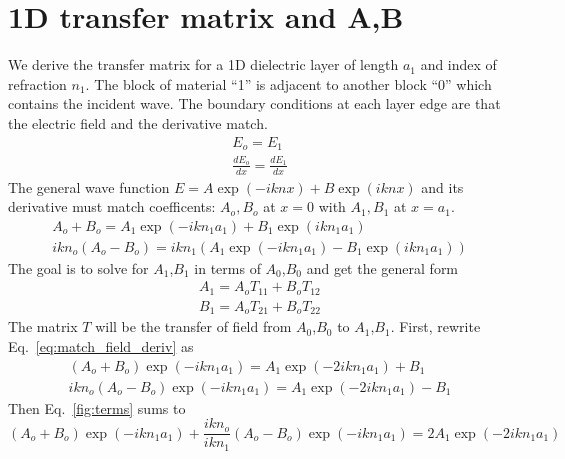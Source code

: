\section{1D transfer matrix and A,B}
We derive the transfer matrix for a 1D dielectric layer of length $a_1$ and index of refraction $n_1$. The block of material ``1'' is adjacent to another block ``0'' which contains the incident wave. The boundary conditions at each layer edge are that the electric field and the derivative match.
\begin{equation}
\begin{gathered}
E_o = E_1\\
\frac{dE_o}{dx} = \frac{dE_1}{dx}
\end{gathered}
\end{equation}
The general wave function $E=A \exp(-i k n x) + B \exp(i k n x)$ and its derivative must match coefficents: $A_o, B_o$ at $x=0$ with $A_1, B_1$ at $x=a_1$.
\begin{equation}
\begin{gathered}
A_o + B_o = A_1 \exp(-i k n_1 a_1) + B_1 \exp(i k n_1 a_1)\\
i k n_o (A_o - B_o) = i k n_1 (A_1 \exp(-i k n_1 a_1) - B_1 \exp(i k n_1 a_1))
\end{gathered}
\label{eq:match_field_deriv}
\end{equation}
The goal is to solve for $A_1$,$B_1$ in terms of $A_0$,$B_0$ and get the general form
\begin{equation}
\begin{gathered}
A_1 = A_o T_{11} + B_o T_{12} \\
B_1 = A_o T_{21} + B_o T_{22}
\end{gathered}
\end{equation}
The matrix $T$ will be the transfer of field from $A_0$,$B_0$ to $A_1$,$B_1$. First, rewrite Eq.~\ref{eq:match_field_deriv} as
\begin{equation}
\begin{gathered}
(A_o + B_o) \exp(-i k n_1 a_1) = A_1 \exp(-2 i k n_1 a_1) + B_1 \\
i k n_o (A_o - B_o) \exp(-i k n_1 a_1) = A_1 \exp(-2 i k n_1 a_1) - B_1
\label{fig:terms}
\end{gathered}
\end{equation}
Then Eq.~\ref{fig:terms} sums to
\begin{equation}
(A_o + B_o) \exp(-i k n_1 a_1) + \frac{i k n_o}{i k n_1} (A_o - B_o) \exp(-i k n_1 a_1) = 2 A_1 \exp(-2 i k n_1 a_1)
\end{equation}
